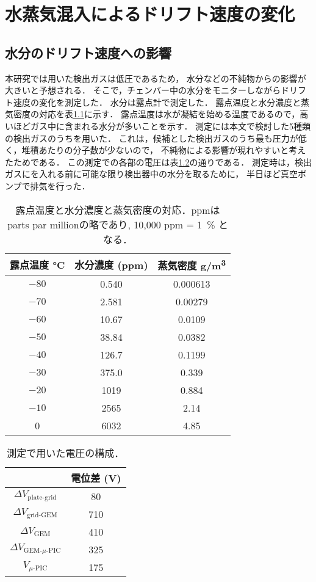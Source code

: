 \documentclass[../master]{subfiles}
\begin{document}
\chapter{水蒸気混入によるドリフト速度の変化}
\label{app::drift_speed_humid_dep}
\section{水分のドリフト速度への影響}
本研究では用いた検出ガスは低圧であるため，
水分などの不純物からの影響が大きいと予想される．
そこで，チェンバー中の水分をモニターしながらドリフト速度の変化を測定した．
水分は露点計で測定した．
露点温度と水分濃度と蒸気密度の対応を表\ref{tab::dew_point_humidity}に示す．
露点温度は水が凝結を始める温度であるので，高いほどガス中に含まれる水分が多いことを示す．
測定には本文で検討した5種類の検出ガスのうち\Methane を用いた．
これは，候補とした検出ガスのうち最も圧力が低く，堆積あたりの分子数が少ないので，
不純物による影響が現れやすいと考えたためである．
この測定での各部の電圧は表\ref{tab::configuration_for_drift_dep}の通りである．
測定時は，検出ガスにを入れる前に可能な限り検出器中の水分を取るために，
半日ほど真空ポンプで排気を行った．
\begin{table}
  \centering
  \caption{露点温度と水分濃度と蒸気密度の対応．ppmはparts par millionの略であり, 10,000 ppm = \SI{1}{\percent} となる．}
  \label{tab::dew_point_humidity}
  \begin{tabular}{ccc}
    \toprule
    露点温度 \si{\degreeCelsius} & 水分濃度 (ppm) & 蒸気密度 \si{\gram/\cubic\metre} \\
    \midrule
    $-80$ & 0.540 & 0.000613 \\
    $-70$ & 2.581 & 0.00279 \\
    $-60$ & 10.67 & 0.0109 \\
    $-50$ & 38.84 & 0.0382 \\
    $-40$ & 126.7 & 0.1199 \\
    $-30$ & 375.0 & 0.339 \\
    $-20$ & 1019 & 0.884 \\
    $-10$ & 2565 & 2.14 \\
    0     & 6032 & 4.85 \\
    \bottomrule
  \end{tabular}
\end{table}
\begin{table}
  \centering
  \caption{測定で用いた電圧の構成．}
  \label{tab::configuration_for_drift_dep}
  \begin{tabular}{cc}
    \toprule
    & 電位差 (\si{\volt}) \\
    \midrule
    $\Delta V_{\text{plate-grid}}$ & 80 \\
    $\Delta V_{\text{grid-GEM}}$ & 710 \\
    $\Delta V_{\text{GEM}}$ & 410 \\
    $\Delta V_{\text{GEM-}\mu\text{-PIC}}$ & 325 \\
    $V_{\mu\text{-PIC}}$ & 175 \\
    \bottomrule
  \end{tabular}
\end{table}
\end{document}
